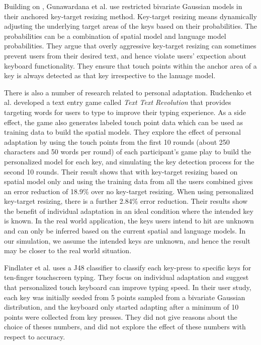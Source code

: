 \documentclass{sigchi}
\begin{document}
Building on \cite{Goodman:2002}, Gunawardana et al. \cite{Gunawardana:2010} use restricted bivariate Gaussian
models in their anchored key-target resizing method. Key-target resizing means dynamically
adjusting the underlying target areas of the keys based on their probabilities. The probabilities can 
be a combination of spatial model and language model probabilities.
They argue that overly aggressive
key-target resizing can sometimes prevent users from their desired text, and hence violate
users' expection about keyboard functionality. They ensure that touch points within
the anchor area of a key is always detected as that key irrespective to the lanuage model.

There is also a number of research related to personal adaptation. 
Rudchenko et al. \cite{Rudchenko:2011}
developed a text entry game called \textit{Text Text Revolution} that provides 
targeting words for users to type to improve their typing experience. As a side effect,
the game also generates labeled touch point data which can be used as
training data to build the spatial models. They explore the effect of personal adaptation
by using the touch points from the first 10 rounds (about 250 characters and 50 words per round) of each 
participant's game play to build the personalized model for each key, and simulating the key detection
process for the second 10 rounds. Their result shows that with key-target resizing based on
spatial model only and using the training data from all the users combined
gives an error reduction of 18.9\% over no key-target resizing. When using personalized
key-target resizing, there is a further 2.84\% error reduction.
Their results show the benefit of individual adaptation in an ideal condition where the 
intended key is known. In the real world application, the keys users intend to hit are unknown and
can only be inferred based on the current spatial and language models. In our simulation, we assume the 
intended keys are unknown, and hence the result may be closer to the real world situation. 

Findlater et al. \cite{Findlater:2012} uses a J48 classifier to classify
each key-press to specific keys for ten-finger touchscreen typing. They
focus on individual adaptation and suggest that personalized touch keyboard
 can improve typing speed.  
In their user study, each key was initially seeded from 5 points sampled from
a bivariate Gaussian distribution, and the keyboard only started adapting
after a minimum of 10 points were collected from key presses. They did not
give reasons about the choice of theses numbers, and did not explore the
effect of these numbers with respect to accuracy. 
\end{document}
